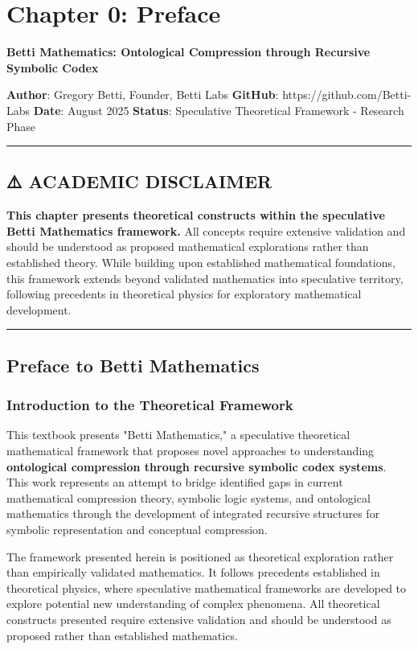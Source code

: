 \chapter{Chapter 0: Preface}

\textbf{Betti Mathematics: Ontological Compression through Recursive Symbolic Codex}

\textbf{Author}: Gregory Betti, Founder, Betti Labs  
\textbf{GitHub}: https://github.com/Betti-Labs  
\textbf{Date}: August 2025  
\textbf{Status}: Speculative Theoretical Framework - Research Phase

\hrule

\section{⚠️ ACADEMIC DISCLAIMER}

\textbf{This chapter presents theoretical constructs within the speculative Betti Mathematics framework.} All concepts require extensive validation and should be understood as proposed mathematical explorations rather than established theory. While building upon established mathematical foundations, this framework extends beyond validated mathematics into speculative territory, following precedents in theoretical physics for exploratory mathematical development.

\hrule

\section{Preface to Betti Mathematics}

\subsection{Introduction to the Theoretical Framework}

This textbook presents "Betti Mathematics," a speculative theoretical mathematical framework that proposes novel approaches to understanding \textbf{ontological compression through recursive symbolic codex systems}. This work represents an attempt to bridge identified gaps in current mathematical compression theory, symbolic logic systems, and ontological mathematics through the development of integrated recursive structures for symbolic representation and conceptual compression.

The framework presented herein is positioned as theoretical exploration rather than empirically validated mathematics. It follows precedents established in theoretical physics, where speculative mathematical frameworks are developed to explore potential new understanding of complex phenomena. All theoretical constructs presented require extensive validation and should be understood as proposed rather than established mathematics.

